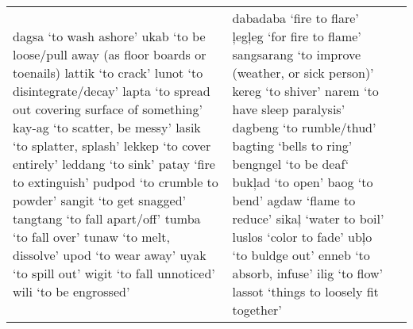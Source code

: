 \begin{table}
{\begin{tabular}{
        >{\RaggedRight\arraybackslash}p{4cm}
        >{\RaggedRight\arraybackslash}p{4.1cm}
        >{\RaggedRight\arraybackslash}p{4cm}
                    }
dagsa ‘to wash ashore’ \newline
ukab ‘to be loose/pull away (as floor boards or toenails) \newline
lattik ‘to crack’ \newline
lunot ‘to disintegrate/decay’ \newline
lapta ‘to spread out covering surface of something’ \newline
kay-ag ‘to scatter, be messy’ \newline
lasik ‘to splatter, splash’ \newline
lekkep ‘to cover entirely’ \newline
leddang ‘to sink’ \newline
patay ‘fire to extinguish’ \newline
pudpod ‘to crumble to powder’ \newline
sangit  ‘to get snagged’ \newline
tangtang ‘to fall apart/off’ \newline
tumba ‘to fall over’ \newline
tunaw ‘to melt, dissolve' \newline
upod ‘to wear away’ \newline
uyak ‘to spill out’ \newline
wigit ‘to fall unnoticed' \newline
wili ‘to be engrossed' &
dabadaba ‘fire to flare' \newline
ļegļeg ‘for fire to flame’ \newline
sangsarang ‘to improve (weather, or sick person)’ \newline
kereg ‘to shiver’ \newline
narem ‘to have sleep paralysis' \newline
dagbeng ‘to rumble/thud’ \newline
bagting ‘bells to ring’ \newline
bengngel ‘to be deaf‘ \newline
bukļad ‘to open’ \newline
baog ‘to bend’ \newline
agdaw ‘flame to reduce’ \newline
sikaļ  ‘water to boil’ \newline
luslos ‘color to fade’ \newline
ubļo ‘to buldge out’ \newline
enneb ‘to absorb, infuse’ \newline
ilig ‘to flow' \newline
lassot ‘things to loosely fit together’ \newline

\end{tabular}}
\end{table}
